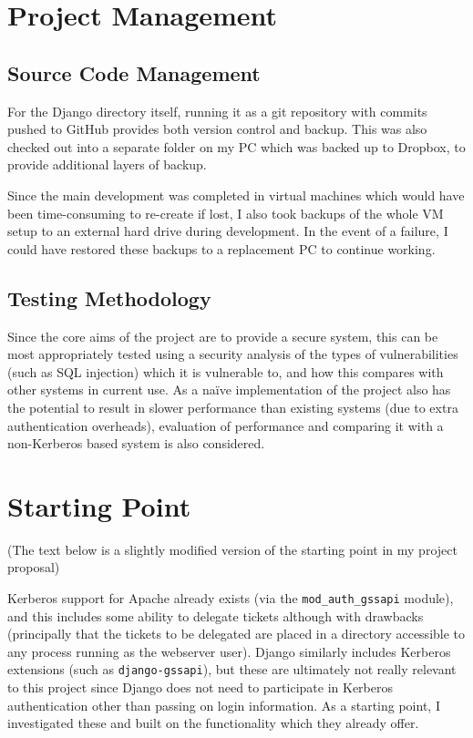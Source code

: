 \documentclass[12pt]{report}
\begin{document}
\section{Project Management}
\subsection{Source Code Management}
For the Django directory itself, running it as a git repository with commits pushed to GitHub provides both version control and backup. This was also checked out into a separate folder on my PC which was backed up to Dropbox, to provide additional layers of backup.

Since the main development was completed in virtual machines which would have been time-consuming to re-create if lost, I also took backups of the whole VM setup to an external hard drive during development. In the event of a failure, I could have restored these backups to a replacement PC to continue working.

\subsection{Testing Methodology}
Since the core aims of the project are to provide a secure system, this can be most appropriately tested using a security analysis of the types of vulnerabilities (such as SQL injection) which it is vulnerable to, and how this compares with other systems in current use. As a na\"ive implementation of the project also has the potential to result in slower performance than existing systems (due to extra authentication overheads), evaluation of performance and comparing it with a non-Kerberos based system is also considered.

\section{Starting Point}
\label{sec:starting_point}
(The text below is a slightly modified version of the starting point in my project proposal)

Kerberos support for Apache already exists (via the \verb+mod_auth_gssapi+ module), and this includes some ability to delegate tickets although with drawbacks (principally that the tickets to be delegated are placed in a directory accessible to any process running as the webserver user). Django similarly includes Kerberos extensions (such as \verb+django-gssapi+), but these are ultimately not really relevant to this project since Django does not need to participate in Kerberos authentication other than passing on login information. As a starting point, I investigated these and built on the functionality which they already offer.
\end{document}
